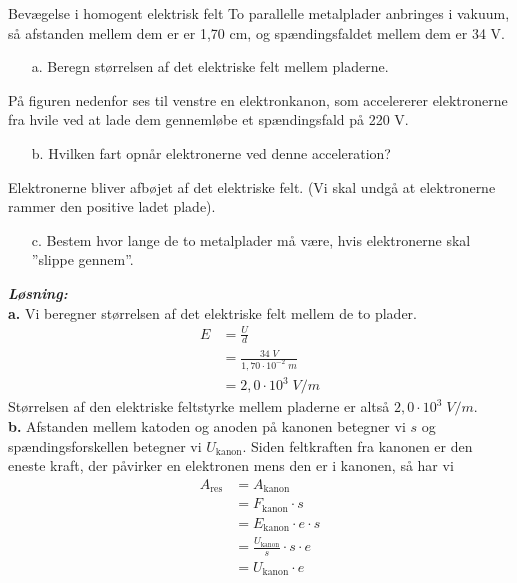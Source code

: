 \documentclass{report}
\newcommand{\sol}{\setlength{\parindent}{0cm}\textbf{\textit{Løsning:}}\setlength{\parindent}{1cm}}
\begin{document}
\begin{question}{Bevægelse i homogent elektrisk felt}{}
  To parallelle metalplader anbringes i vakuum, så afstanden mellem dem er er 1,70 cm, og spændingsfaldet mellem dem er 34 V.
  \begin{itemize}
    \item[a.] Beregn størrelsen af det elektriske felt mellem pladerne.
  \end{itemize}
På figuren nedenfor ses til venstre en elektronkanon, som accelererer elektronerne fra hvile ved at lade dem gennemløbe et spændingsfald på 220 V.
\begin{itemize}
  \item[b.] Hvilken fart opnår elektronerne ved denne acceleration?
\end{itemize}
Elektronerne bliver afbøjet af det elektriske felt. (Vi skal undgå at elektronerne rammer den positive ladet plade).
\begin{itemize}
  \item[c.] Bestem hvor lange de to metalplader må være, hvis elektronerne skal ”slippe gennem”.
\end{itemize}
\end{question}
\sol \\
\textbf{a.}
Vi beregner størrelsen af det elektriske felt mellem de to plader.
\begin{equation*}
\begin{split}
  E&=\frac{U}{d}\\
  &=\frac{34 \;\unit{V} }{1,70 \cdot 10 ^{-2} \;\unit{m} }\\
  &=2,0 \cdot 10 ^{3} \;\unit{V/m} 
\end{split}
\end{equation*}
Størrelsen af den elektriske feltstyrke mellem pladerne er altså $2,0 \cdot 10^3 \;\unit{V/m} $.\\[1ex]
\textbf{b.}
Afstanden mellem katoden og anoden på kanonen betegner vi $s$ og spændingsforskellen betegner vi $U _{\text{kanon} }$.
Siden feltkraften fra kanonen er den eneste kraft, der påvirker en elektronen mens den er i kanonen, så har vi 
\begin{equation*}
\begin{split}
  A _{\text{res} }&=A _{\text{kanon} }\\
  &=F _{\text{kanon} } \cdot s \\
  &=E _{\text{kanon} } \cdot e \cdot s\\
  &=\frac{U _{\text{kanon} }}{s} \cdot s \cdot e \\
  &=U _{\text{kanon} } \cdot e
\end{split}
\end{equation*}
\end{document}
